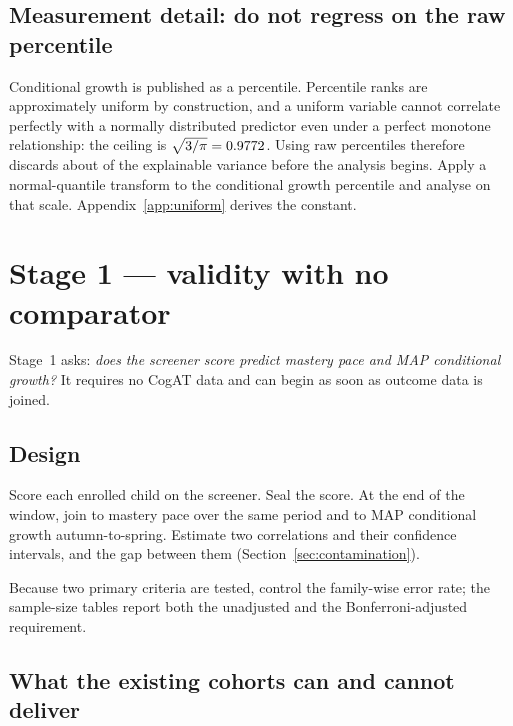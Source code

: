 \documentclass[11pt,a4paper]{article}
\begin{document}

\subsection{Measurement detail: do not regress on the raw percentile}

Conditional growth is published as a percentile. Percentile ranks are
approximately uniform by construction, and a uniform variable cannot correlate
perfectly with a normally distributed predictor even under a perfect monotone
relationship: the ceiling is $\sqrt{3/\pi}=0.9772$. Using raw
percentiles therefore discards about \UniformAttenLossPct{} of the explainable
variance before the analysis begins. Apply a normal-quantile transform to the
conditional growth percentile and analyse on that scale.
Appendix~\ref{app:uniform} derives the constant.

\section{Stage 1 --- validity with no comparator}
\label{sec:stage1}

Stage~1 asks: \emph{does the screener score predict mastery pace and MAP
conditional growth?} It requires no CogAT data and can begin as soon as outcome
data is joined.

\subsection{Design}

Score each enrolled child on the screener. Seal the score. At the end of the
window, join to mastery pace over the same period and to MAP conditional growth
autumn-to-spring. Estimate two correlations and their confidence intervals, and
the gap between them (Section~\ref{sec:contamination}).

Because two primary criteria are tested, control the family-wise error rate;
the sample-size tables report both the unadjusted and the Bonferroni-adjusted
requirement.

\subsection{What the existing cohorts can and cannot deliver}
\end{document}
